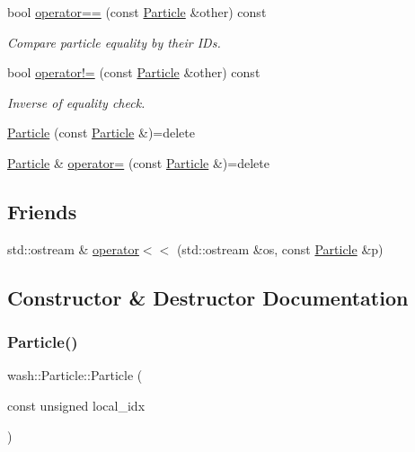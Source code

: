 \begin{DoxyCompactItemize}
\item 
bool \mbox{\hyperlink{classwash_1_1Particle_a32369e6edba4277ebc71917a37c2503d}{operator==}} (const \mbox{\hyperlink{classwash_1_1Particle}{Particle}} \&other) const
\begin{DoxyCompactList}\small\item\em Compare particle equality by their I\+Ds. \end{DoxyCompactList}\item 
bool \mbox{\hyperlink{classwash_1_1Particle_a32f1334a8a0b273a57355956d7e9fe63}{operator!=}} (const \mbox{\hyperlink{classwash_1_1Particle}{Particle}} \&other) const
\begin{DoxyCompactList}\small\item\em Inverse of equality check. \end{DoxyCompactList}\item 
\mbox{\hyperlink{classwash_1_1Particle_a9ca04366cb7412e6aa5d1d89108a8520}{Particle}} (const \mbox{\hyperlink{classwash_1_1Particle}{Particle}} \&)=delete
\item 
\mbox{\hyperlink{classwash_1_1Particle}{Particle}} \& \mbox{\hyperlink{classwash_1_1Particle_a8ac44cec043e444a45ab189f666f9d4b}{operator=}} (const \mbox{\hyperlink{classwash_1_1Particle}{Particle}} \&)=delete
\end{DoxyCompactItemize}
\subsection*{Friends}
\begin{DoxyCompactItemize}
\item 
std\+::ostream \& \mbox{\hyperlink{classwash_1_1Particle_ad7d60c63b6d14d1d0d4fe42d4e9dc8bc}{operator$<$$<$}} (std\+::ostream \&os, const \mbox{\hyperlink{classwash_1_1Particle}{Particle}} \&p)
\end{DoxyCompactItemize}


\subsection{Constructor \& Destructor Documentation}
\mbox{\label{classwash_1_1Particle_a72131cdf3fdbcada383d81604fd49503}} 
\subsubsection{\texorpdfstring{Particle()}{Particle()}\hspace{0.1cm}{\footnotesize\ttfamily [1/2]}}
{\footnotesize\ttfamily wash\+::\+Particle\+::\+Particle (\begin{DoxyParamCaption}\item[{const unsigned}]{local\+\_\+idx }\end{DoxyParamCaption})}



